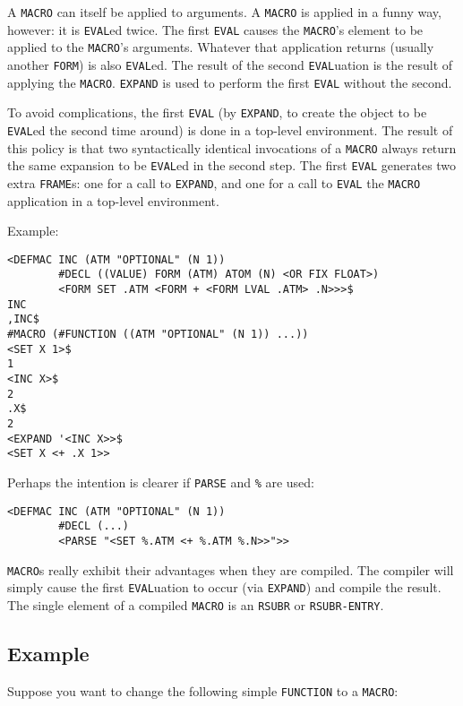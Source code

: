 \documentclass[a4paper]{scrbook}
\begin{document}
A \texttt{MACRO} can itself be applied to arguments. A \texttt{MACRO} is applied in a funny way, however: it is
\texttt{EVAL}ed twice. The first \texttt{EVAL} causes the \texttt{MACRO}'s element to be applied to the \texttt{MACRO}'s
arguments. Whatever that application returns (usually another \texttt{FORM}) is also \texttt{EVAL}ed. The result of the
second \texttt{EVAL}uation is the result of applying the \texttt{MACRO}. \texttt{EXPAND} is
used to perform the first \texttt{EVAL} without the second.

To avoid complications, the first \texttt{EVAL} (by \texttt{EXPAND}, to create the object to be \texttt{EVAL}ed the second
time around) is done in a top-level environment. The result of this policy is that two syntactically identical invocations
of a \texttt{MACRO} always return the same expansion to be \texttt{EVAL}ed in the second step. The first \texttt{EVAL}
generates two extra \texttt{FRAME}s: one for a call to \texttt{EXPAND}, and one for a call to \texttt{EVAL} the
\texttt{MACRO} application in a top-level environment.

Example:

\begin{verbatim}
<DEFMAC INC (ATM "OPTIONAL" (N 1))
        #DECL ((VALUE) FORM (ATM) ATOM (N) <OR FIX FLOAT>)
        <FORM SET .ATM <FORM + <FORM LVAL .ATM> .N>>>$
INC
,INC$
#MACRO (#FUNCTION ((ATM "OPTIONAL" (N 1)) ...))
<SET X 1>$
1
<INC X>$
2
.X$
2
<EXPAND '<INC X>>$
<SET X <+ .X 1>>
\end{verbatim}

Perhaps the intention is clearer if \texttt{PARSE} and \texttt{\%} are used:

\begin{verbatim}
<DEFMAC INC (ATM "OPTIONAL" (N 1))
        #DECL (...)
        <PARSE "<SET %.ATM <+ %.ATM %.N>>">>
\end{verbatim}

\texttt{MACRO}s really exhibit their advantages when they are compiled. The compiler will simply cause the first
\texttt{EVAL}uation to occur (via \texttt{EXPAND}) and compile the result. The single element of a compiled \texttt{MACRO}
is an \texttt{RSUBR} or \texttt{RSUBR-ENTRY}.

\subsection{Example}\label{example}

Suppose you want to change the following simple \texttt{FUNCTION} to a \texttt{MACRO}:
\end{document}
